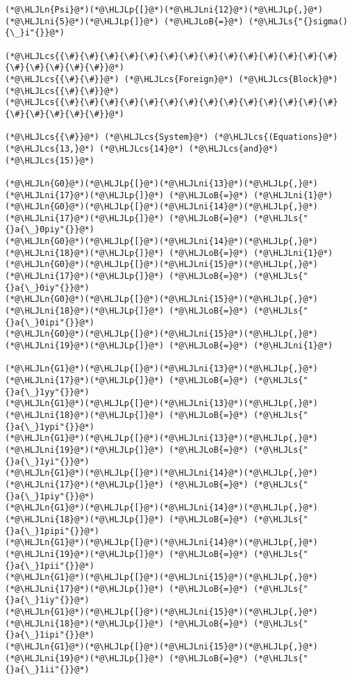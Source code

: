 \documentclass[12pt,a4paper]{article}
\newcommand{\HLJLn}[1]{#1}
\newcommand{\HLJLs}[1]{\textcolor[RGB]{201,61,57}{#1}}
\newcommand{\HLJLni}[1]{\textcolor[RGB]{59,151,46}{#1}}
\newcommand{\HLJLoB}[1]{\textcolor[RGB]{102,102,102}{\textbf{#1}}}
\newcommand{\HLJLp}[1]{#1}
\newcommand{\HLJLcs}[1]{\textcolor[RGB]{153,153,119}{\textit{#1}}}
\begin{document}
\begin{lstlisting}
(*@\HLJLn{Psi}@*)(*@\HLJLp{[}@*)(*@\HLJLni{12}@*)(*@\HLJLp{,}@*)(*@\HLJLni{5}@*)(*@\HLJLp{]}@*) (*@\HLJLoB{=}@*) (*@\HLJLs{"{}sigma(){\_}i"{}}@*)

(*@\HLJLcs{{\#}{\#}{\#}{\#}{\#}{\#}{\#}{\#}{\#}{\#}{\#}{\#}{\#}{\#}{\#}{\#}{\#}{\#}{\#}}@*)
(*@\HLJLcs{{\#}{\#}}@*) (*@\HLJLcs{Foreign}@*) (*@\HLJLcs{Block}@*) (*@\HLJLcs{{\#}{\#}}@*)
(*@\HLJLcs{{\#}{\#}{\#}{\#}{\#}{\#}{\#}{\#}{\#}{\#}{\#}{\#}{\#}{\#}{\#}{\#}{\#}{\#}{\#}}@*)

(*@\HLJLcs{{\#}}@*) (*@\HLJLcs{System}@*) (*@\HLJLcs{(Equations}@*) (*@\HLJLcs{13,}@*) (*@\HLJLcs{14}@*) (*@\HLJLcs{and}@*) (*@\HLJLcs{15)}@*)

(*@\HLJLn{G0}@*)(*@\HLJLp{[}@*)(*@\HLJLni{13}@*)(*@\HLJLp{,}@*)(*@\HLJLni{17}@*)(*@\HLJLp{]}@*) (*@\HLJLoB{=}@*) (*@\HLJLni{1}@*)
(*@\HLJLn{G0}@*)(*@\HLJLp{[}@*)(*@\HLJLni{14}@*)(*@\HLJLp{,}@*)(*@\HLJLni{17}@*)(*@\HLJLp{]}@*) (*@\HLJLoB{=}@*) (*@\HLJLs{"{}a{\_}0piy"{}}@*)
(*@\HLJLn{G0}@*)(*@\HLJLp{[}@*)(*@\HLJLni{14}@*)(*@\HLJLp{,}@*)(*@\HLJLni{18}@*)(*@\HLJLp{]}@*) (*@\HLJLoB{=}@*) (*@\HLJLni{1}@*)
(*@\HLJLn{G0}@*)(*@\HLJLp{[}@*)(*@\HLJLni{15}@*)(*@\HLJLp{,}@*)(*@\HLJLni{17}@*)(*@\HLJLp{]}@*) (*@\HLJLoB{=}@*) (*@\HLJLs{"{}a{\_}0iy"{}}@*)
(*@\HLJLn{G0}@*)(*@\HLJLp{[}@*)(*@\HLJLni{15}@*)(*@\HLJLp{,}@*)(*@\HLJLni{18}@*)(*@\HLJLp{]}@*) (*@\HLJLoB{=}@*) (*@\HLJLs{"{}a{\_}0ipi"{}}@*)
(*@\HLJLn{G0}@*)(*@\HLJLp{[}@*)(*@\HLJLni{15}@*)(*@\HLJLp{,}@*)(*@\HLJLni{19}@*)(*@\HLJLp{]}@*) (*@\HLJLoB{=}@*) (*@\HLJLni{1}@*)

(*@\HLJLn{G1}@*)(*@\HLJLp{[}@*)(*@\HLJLni{13}@*)(*@\HLJLp{,}@*)(*@\HLJLni{17}@*)(*@\HLJLp{]}@*) (*@\HLJLoB{=}@*) (*@\HLJLs{"{}a{\_}1yy"{}}@*)
(*@\HLJLn{G1}@*)(*@\HLJLp{[}@*)(*@\HLJLni{13}@*)(*@\HLJLp{,}@*)(*@\HLJLni{18}@*)(*@\HLJLp{]}@*) (*@\HLJLoB{=}@*) (*@\HLJLs{"{}a{\_}1ypi"{}}@*)
(*@\HLJLn{G1}@*)(*@\HLJLp{[}@*)(*@\HLJLni{13}@*)(*@\HLJLp{,}@*)(*@\HLJLni{19}@*)(*@\HLJLp{]}@*) (*@\HLJLoB{=}@*) (*@\HLJLs{"{}a{\_}1yi"{}}@*)
(*@\HLJLn{G1}@*)(*@\HLJLp{[}@*)(*@\HLJLni{14}@*)(*@\HLJLp{,}@*)(*@\HLJLni{17}@*)(*@\HLJLp{]}@*) (*@\HLJLoB{=}@*) (*@\HLJLs{"{}a{\_}1piy"{}}@*)
(*@\HLJLn{G1}@*)(*@\HLJLp{[}@*)(*@\HLJLni{14}@*)(*@\HLJLp{,}@*)(*@\HLJLni{18}@*)(*@\HLJLp{]}@*) (*@\HLJLoB{=}@*) (*@\HLJLs{"{}a{\_}1pipi"{}}@*)
(*@\HLJLn{G1}@*)(*@\HLJLp{[}@*)(*@\HLJLni{14}@*)(*@\HLJLp{,}@*)(*@\HLJLni{19}@*)(*@\HLJLp{]}@*) (*@\HLJLoB{=}@*) (*@\HLJLs{"{}a{\_}1pii"{}}@*)
(*@\HLJLn{G1}@*)(*@\HLJLp{[}@*)(*@\HLJLni{15}@*)(*@\HLJLp{,}@*)(*@\HLJLni{17}@*)(*@\HLJLp{]}@*) (*@\HLJLoB{=}@*) (*@\HLJLs{"{}a{\_}1iy"{}}@*)
(*@\HLJLn{G1}@*)(*@\HLJLp{[}@*)(*@\HLJLni{15}@*)(*@\HLJLp{,}@*)(*@\HLJLni{18}@*)(*@\HLJLp{]}@*) (*@\HLJLoB{=}@*) (*@\HLJLs{"{}a{\_}1ipi"{}}@*)
(*@\HLJLn{G1}@*)(*@\HLJLp{[}@*)(*@\HLJLni{15}@*)(*@\HLJLp{,}@*)(*@\HLJLni{19}@*)(*@\HLJLp{]}@*) (*@\HLJLoB{=}@*) (*@\HLJLs{"{}a{\_}1ii"{}}@*)


\end{lstlisting}
\end{document}
